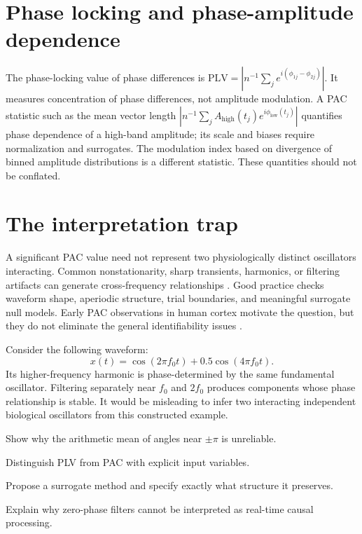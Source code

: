 \section{Phase locking and phase-amplitude dependence}
The phase-locking value of phase differences is $\mathrm{PLV}=|n^{-1}\sum_j e^{i(\phi_{1j}-\phi_{2j})}|$. It measures concentration of phase differences, not amplitude modulation. A PAC statistic such as the mean vector length $|n^{-1}\sum_j A_{\mathrm{high}}(t_j)e^{i\phi_{\mathrm{low}}(t_j)}|$ quantifies phase dependence of a high-band amplitude; its scale and biases require normalization and surrogates. The modulation index based on divergence of binned amplitude distributions is a different statistic. These quantities should not be conflated.

\section{The interpretation trap}
A significant PAC value need not represent two physiologically distinct oscillators interacting. Common nonstationarity, sharp transients, harmonics, or filtering artifacts can generate cross-frequency relationships \cite{Aru2015}. Good practice checks waveform shape, aperiodic structure, trial boundaries, and meaningful surrogate null models. Early PAC observations in human cortex motivate the question, but they do not eliminate the general identifiability issues \cite{Canolty2006}.

\begin{workedexample}
Consider the following waveform:
\[x(t)=\cos(2\pi f_0 t)+0.5\cos(4\pi f_0 t).\]
Its higher-frequency harmonic is phase-determined by the same fundamental oscillator. Filtering separately near $f_0$ and $2f_0$ produces components whose phase relationship is stable. It would be misleading to infer two interacting independent biological oscillators from this constructed example.
\end{workedexample}
\begin{exercises}
\item Show why the arithmetic mean of angles near $\pm\pi$ is unreliable.
\item Distinguish PLV from PAC with explicit input variables.
\item Propose a surrogate method and specify exactly what structure it preserves.
\item Explain why zero-phase filters cannot be interpreted as real-time causal processing.
\end{exercises}